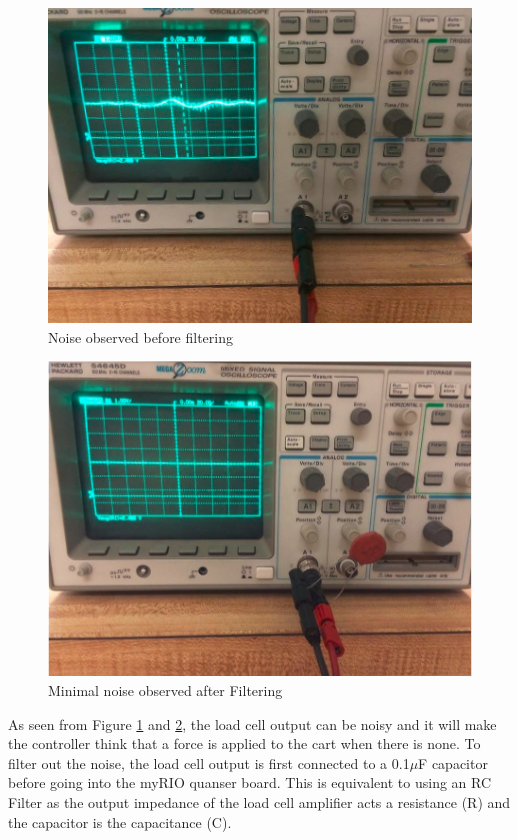 \begin{figure}[ht]
\begin{center}
\includegraphics[width=1\linewidth]{Images/Before_Filter.PNG}
\caption{Noise observed before filtering}
\label{B_Filter}
\end{center}
\end{figure}
\begin{figure}[ht]
\begin{center}
\includegraphics[width=1\linewidth]{Images/After_Filter.PNG}
\caption{Minimal noise observed after Filtering}
\label{A_Filter}
\end{center}
\end{figure}
As seen from Figure \ref{B_Filter} and \ref{A_Filter}, the load cell output can be noisy and it will make the controller think that a force is applied to the cart when there is none. To filter out the noise, the load cell output is first connected to a 0.1$\mu$F capacitor before going into the myRIO quanser board. This is equivalent to using an RC Filter as the output impedance of the load cell amplifier acts a resistance (R) and the capacitor is the capacitance (C).

